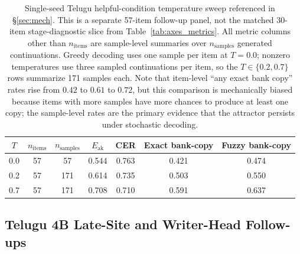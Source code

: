 \documentclass{article}
\begin{document}
\begin{table}[H]
\centering
\small
\setlength{\tabcolsep}{8pt}
\begin{tabular}{ccccccc}
\toprule
\textbf{$T$} & \textbf{$n_{\mathrm{items}}$} & \textbf{$n_{\mathrm{samples}}$} & \textbf{$E_{\mathrm{ak}}$} & \textbf{CER} & \textbf{Exact bank-copy} & \textbf{Fuzzy bank-copy} \\
\midrule
0.0 & 57 & 57  & 0.544 & 0.763 & 0.421 & 0.474 \\
0.2 & 57 & 171 & 0.614 & 0.735 & 0.503 & 0.550 \\
0.7 & 57 & 171 & 0.708 & 0.710 & 0.591 & 0.637 \\
\bottomrule
\end{tabular}
\caption{Single-seed Telugu helpful-condition temperature sweep referenced in \S\ref{sec:mech}. This is a separate 57-item follow-up panel, not the matched 30-item stage-diagnostic slice from Table~\ref{tab:axes_metrics}. All metric columns other than $n_{\mathrm{items}}$ are sample-level summaries over $n_{\mathrm{samples}}$ generated continuations. Greedy decoding uses one sample per item at $T{=}0.0$; nonzero temperatures use three sampled continuations per item, so the $T \in \{0.2, 0.7\}$ rows summarize 171 samples each. Note that item-level ``any exact bank copy'' rates rise from $0.42$ to $0.61$ to $0.72$, but this comparison is mechanically biased because items with more samples have more chances to produce at least one copy; the sample-level rates are the primary evidence that the attractor persists under stochastic decoding.}
\label{tab:tempsweep}
\end{table}

\subsection{Telugu 4B Late-Site and Writer-Head Follow-ups}\label{app:telugu_followups}
\end{document}
